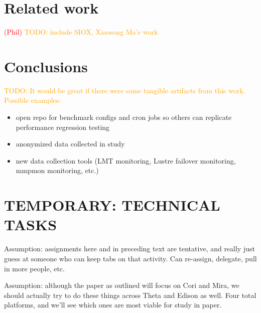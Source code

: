 \documentclass[conference,10pt,compsocconf]{IEEEtran}
\newcommand{\assign}[1]{\textcolor{red}{(#1)}}
\newcommand{\todo}[1]{\textcolor{Orange}{TODO: #1}}
\begin{document}
\section{Related work}

\assign{Phil} \todo{include SIOX, Xiaosong Ma's work}

\section{Conclusions}

\todo{It would be great if there were some tangible artifacts from this work.
Possible examples:}
\begin{itemize}
\item open repo for benchmark configs and cron jobs so others can replicate
performance regression testing
\item anonymized data collected in study
\item new data collection tools (LMT monitoring, Lustre failover monitoring,
mmpmon monitoring, etc.)
\end{itemize}

\section{TEMPORARY: TECHNICAL TASKS}

Assumption: assignments here and in preceding text are tentative, and really
just guess at someone who can keep tabs on that activity.  Can re-assign,
delegate, pull in more people, etc.

Assumption: although the paper as outlined will focus on Cori and Mira, we
should actually try to do these things across Theta and Edison as well.  Four
total platforms, and we'll see which ones are most viable for study in paper.
\end{document}
